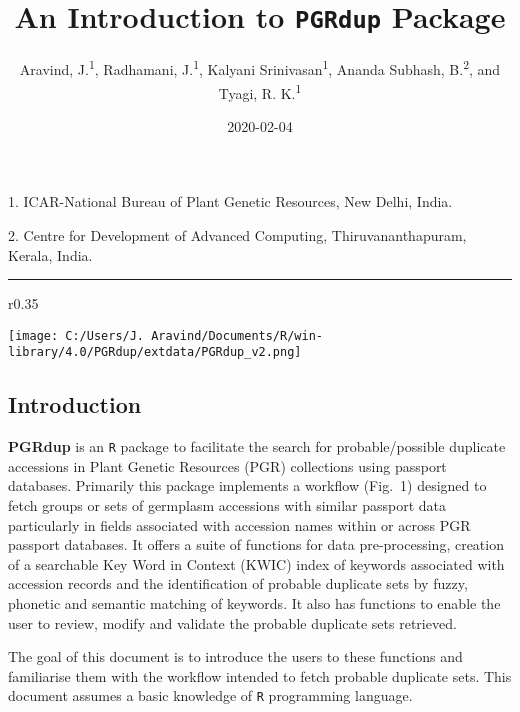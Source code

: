 \documentclass[
]{article}
\title{An Introduction to \texttt{PGRdup} Package}
\author{Aravind, J.\textsuperscript{1}, Radhamani, J.\textsuperscript{1},
Kalyani Srinivasan\textsuperscript{1}, Ananda Subhash,
B.\textsuperscript{2}, and Tyagi, R. K.\textsuperscript{1}}
\date{2020-02-04}
\begin{document}
\maketitle

\begin{center}
1. ICAR-National Bureau of Plant Genetic Resources, New Delhi, India.

2. Centre for Development of Advanced Computing, Thiruvananthapuram, Kerala, India.

\end{center}

\begin{center}
\vspace{6pt}
\hrule
\end{center}

\tableofcontents

\begin{wrapfigure}{r}{0.35\textwidth}
  \vspace{1cm}
  \begin{center}
    \texttt{[image: C:/Users/J. Aravind/Documents/R/win-library/4.0/PGRdup/extdata/PGRdup\_v2.png]}
  \end{center}
  \vspace{-1.5cm}
\end{wrapfigure}\leavevmode

\hypertarget{introduction}{%
\subsection{Introduction}\label{introduction}}

\textbf{PGRdup} is an \texttt{R} package to facilitate the search for
probable/possible duplicate accessions in Plant Genetic Resources (PGR)
collections using passport databases. Primarily this package implements
a workflow (Fig.~1) designed to fetch groups or sets of germplasm
accessions with similar passport data particularly in fields associated
with accession names within or across PGR passport databases. It offers
a suite of functions for data pre-processing, creation of a searchable
Key Word in Context (KWIC) index of keywords associated with accession
records and the identification of probable duplicate sets by fuzzy,
phonetic and semantic matching of keywords. It also has functions to
enable the user to review, modify and validate the probable duplicate
sets retrieved.

The goal of this document is to introduce the users to these functions
and familiarise them with the workflow intended to fetch probable
duplicate sets. This document assumes a basic knowledge of \texttt{R}
programming language.
\end{document}

